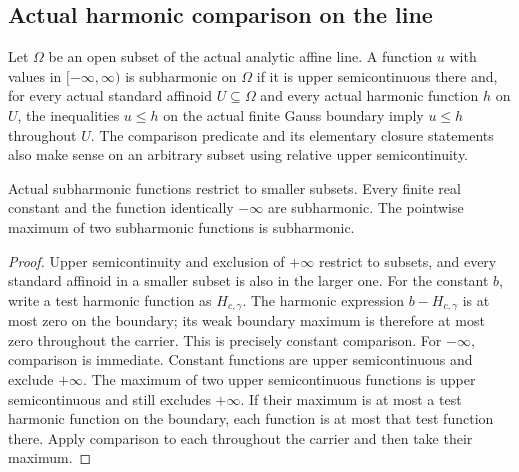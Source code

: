 \subsection{Actual harmonic comparison on the line}\label{subsec:fc-line-subharmonic}

\begin{definition}\label{def:fc-actual-line-subharmonic}
\leanok
{}
Let $\Omega$ be an open subset of the actual analytic affine line. A function
$u$ with values in $[-\infty,\infty)$ is subharmonic on $\Omega$ if it is
upper semicontinuous there and, for every actual standard affinoid
$U\subseteq\Omega$ and every actual harmonic function $h$ on $U$,
the inequalities $u\le h$ on the actual finite Gauss boundary imply
$u\le h$ throughout $U$.
The comparison predicate and its elementary closure statements also make
sense on an arbitrary subset using relative upper semicontinuity.
\end{definition}

\begin{lemma}\label{lem:fc-line-subharmonic-elementary}
\leanok
{}
Actual subharmonic functions restrict to smaller subsets. Every finite real
constant and the function identically $-\infty$ are subharmonic.
The pointwise maximum of two subharmonic functions is subharmonic.
\end{lemma}

\begin{proof}
Upper semicontinuity and exclusion of $+\infty$ restrict to subsets, and
every standard affinoid in a smaller subset is also in the larger one.
For the constant $b$, write a test harmonic function as $H_{c,\gamma}$.
The harmonic expression $b-H_{c,\gamma}$ is at most zero on the boundary;
its weak boundary maximum is therefore at most zero throughout the carrier.
This is precisely constant comparison. For $-\infty$, comparison is
immediate. Constant functions are upper semicontinuous and exclude
$+\infty$.
The maximum of two upper semicontinuous functions is upper semicontinuous
and still excludes $+\infty$. If their maximum is at most a test harmonic
function on the boundary, each function is at most that test function there.
Apply comparison to each throughout the carrier and then take their maximum.
\end{proof}
